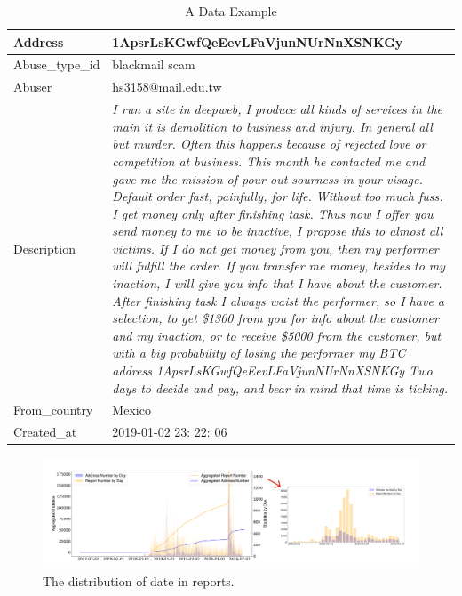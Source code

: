 \begin{table}

\caption{A Data Example}
\label{table:data_detail}
\begin{tabular}{|l|p{6.5cm}|}

\hline
Address & 1ApsrLsKGwfQeEevLFaVjunNUrNnXSNKGy\\ \hline
Abuse\_type\_id  & blackmail scam \\ \hline
Abuser  & hs3158@mail.edu.tw   \\ \hline
Description & \textit{I run a site in deepweb, I produce all kinds of services in the main it is demolition to business and injury. In general all but murder. Often this happens because of rejected love or competition at business. This month he contacted me and gave me the mission of pour out sourness in your visage. Default order fast, painfully, for life. Without too much fuss. I get money only after finishing task. Thus now I offer you send money to me to be inactive, I propose this to almost all victims. If I do not get money from you, then my performer will fulfill the order. If you transfer me money, besides to my inaction, I will give you info that I have about the customer. After finishing task I always waist the performer, so I have a selection, to get \$1300 from you for info about the customer and my inaction, or to receive \$5000 from the customer, but with a big probability of losing the performer
my BTC address 1ApsrLsKGwfQeEevLFaVjunNUrNnXSNKGy
Two days to decide and pay, and bear in mind that time is ticking.} \\ \hline
From\_country & Mexico\\ \hline
Created\_at & 2019-01-02 23: 22: 06 \\ \hline
\end{tabular}
\end{table}

\begin{figure}[tbp]
\centerline{\includegraphics[width=2\columnwidth]{images/full_final_distribution.pdf}}
\caption{The distribution of date in reports.}
\label{fig:date-distribution}
\end{figure}


